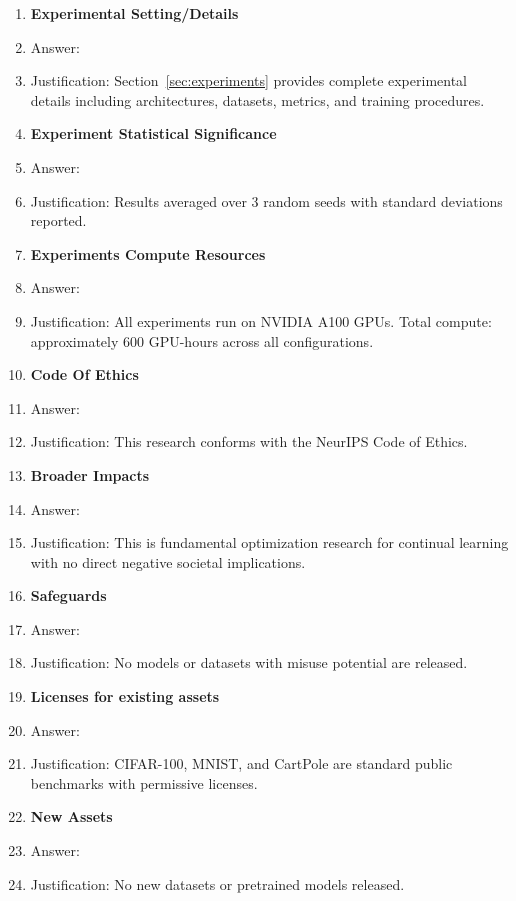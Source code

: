 \documentclass{article}
\begin{document}
\begin{enumerate}
\item {\bf Experimental Setting/Details}
    \item[] Answer: \answerYes{}
    \item[] Justification: Section~\ref{sec:experiments} provides complete experimental details including architectures, datasets, metrics, and training procedures.

\item {\bf Experiment Statistical Significance}
    \item[] Answer: \answerYes{}
    \item[] Justification: Results averaged over 3 random seeds with standard deviations reported.

\item {\bf Experiments Compute Resources}
    \item[] Answer: \answerYes{}
    \item[] Justification: All experiments run on NVIDIA A100 GPUs. Total compute: approximately 600 GPU-hours across all configurations.

\item {\bf Code Of Ethics}
    \item[] Answer: \answerYes{}
    \item[] Justification: This research conforms with the NeurIPS Code of Ethics.

\item {\bf Broader Impacts}
    \item[] Answer: \answerNA{}
    \item[] Justification: This is fundamental optimization research for continual learning with no direct negative societal implications.

\item {\bf Safeguards}
    \item[] Answer: \answerNA{}
    \item[] Justification: No models or datasets with misuse potential are released.

\item {\bf Licenses for existing assets}
    \item[] Answer: \answerYes{}
    \item[] Justification: CIFAR-100, MNIST, and CartPole are standard public benchmarks with permissive licenses.

\item {\bf New Assets}
    \item[] Answer: \answerNA{}
    \item[] Justification: No new datasets or pretrained models released.


\end{enumerate}
\end{document}
